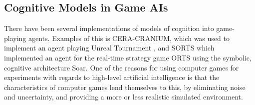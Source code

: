 \subsection{Cognitive Models in Game AIs}
There have been several implementations of models of cognition into game-playing agents. Examples of this is CERA-CRANIUM, which was used to implement an agent playing Unreal Tournament \cite{arrabales2009ceracranium}, and SORTS which implemented an agent for the real-time strategy game ORTS using the symbolic, cognitive architecture Soar.\cite{wintermute2007sorts} One of the reasons for using computer games for experiments with regards to high-level artificial intelligence is that the characteristics of computer games lend themselves to this, by eliminating noise and uncertainty, and providing a more or less realistic simulated environment.
